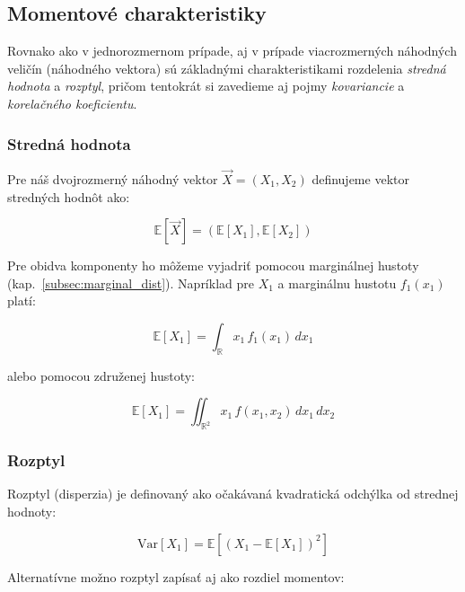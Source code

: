 \subsection{Momentové charakteristiky}\label{joint_moments}

Rovnako ako v jednorozmernom prípade, aj v prípade viacrozmerných náhodných veličín (náhodného vektora) sú základnými charakteristikami rozdelenia \textit{stredná hodnota} a \textit{rozptyl}, pričom tentokrát si zavedieme aj pojmy \textit{kovariancie} a \textit{korelačného koeficientu}.

\subsubsection{Stredná hodnota}\label{subsubsec:joint_mean}

Pre náš dvojrozmerný náhodný vektor \(\vec{X} = (X_1, X_2)\) definujeme vektor stredných hodnôt ako:

\begin{equation}
\mathbb{E}[\vec{X}] = \left( \mathbb{E}[X_1], \mathbb{E}[X_2] \right)
\end{equation}

Pre obidva komponenty ho môžeme vyjadriť pomocou marginálnej hustoty (kap.~\ref{subsec:marginal_dist}). Napríklad pre \(X_1\) a marginálnu hustotu \(f_1(x_1)\) platí:

\begin{equation}
\mathbb{E}[X_1] = \int_{\mathbb{R}} x_1 \, f_1(x_1) \, dx_1
\end{equation}

alebo pomocou združenej hustoty:

\begin{equation}
\mathbb{E}[X_1] = \iint_{\mathbb{R}^2} x_1 \, f(x_1, x_2) \, dx_1 \, dx_2
\end{equation}

\subsubsection{Rozptyl}\label{subsubsec:joint_variance}

Rozptyl (disperzia) je definovaný ako očakávaná kvadratická odchýlka od strednej hodnoty:

\begin{equation}
\mathrm{Var}[X_1] = \mathbb{E}[(X_1 - \mathbb{E}[X_1])^2]
\end{equation}

Alternatívne možno rozptyl zapísať aj ako rozdiel momentov:

